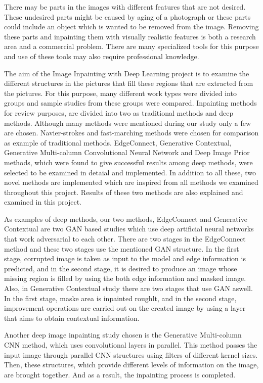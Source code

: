 There may be parts in the images with different features that are not desired. These undesired parts might be caused by aging of a photograph or these parts could include an object which is wanted to be removed from the image. Removing these parts and inpainting them with visually realistic features is both a research area and a commercial problem. There are many specialized tools for this purpose and use of these tools may also require professional knowledge.

The aim of the Image Inpainting with Deep Learning project is to examine the different structures in the pictures that fill these regions that are extracted from the pictures. For this purpose, many different work types were divided into groups and sample studies from these groups were compared. Inpainting methods for review purposes, are divided into two as traditional methods and deep methods. Although many methods were mentioned during our study only a few are chosen. Navier-strokes and fast-marching methods were chosen for comparison as example of traditional methods. EdgeConnect, Generative Contextual, Generative Multi-column Convolutional Neural Network and Deep Image Prior methods, which were found to give successful results among deep methods, were selected to be examined in detaial and implemented. In addition to all these, two novel methods are implemented which are inspired from all methods we examined throughout this project. Results of these two methods are also explained and examined in this project.

As examples of deep methods, our two methods, EdgeConnect and Generative Contextual are two GAN based studies which use deep artificial neural networks that work adversarial to each other. There are two stages in the EdgeConnect method and these two stages use the mentioned GAN structure. In the first stage, corrupted image is taken as input to the model and edge information is predicted, and in the second stage, it is desired to produce an image whose missing region is filled by using the both edge information and masked image. Also, in Generative Contextual study there are two stages that use GAN aswell. In the first stage, maske area is inpainted roughlt, and in the second stage, improvement operations are carried out on the created image by using a layer that aims to obtain contextual information.

Another deep image inpainting study chosen is the Generative Multi-column CNN method, which uses convolutional layers in parallel. This method passes the input image through parallel CNN structures using filters of different kernel sizes. Then, these structures, which provide different levels of information on the image, are brought together. And as a result, the inpainting process is completed.

